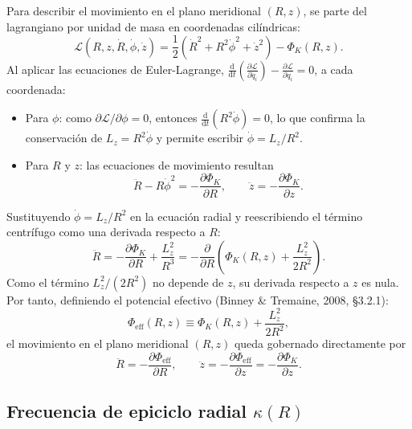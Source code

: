 \documentclass[11pt,letterpaper]{article}
\begin{document}
Para describir el movimiento en el plano meridional $(R, z)$, se parte del lagrangiano por unidad de masa en coordenadas cilíndricas:
\begin{equation}
    \mathcal{L}(R, z, \dot{R}, \dot{\phi}, \dot{z})
    = \frac{1}{2}\left(\dot{R}^2 + R^2\dot{\phi}^2 + \dot{z}^2\right) - \Phi_K(R, z).
\end{equation}
Al aplicar las ecuaciones de Euler-Lagrange, $\frac{\mathrm{d}}{\mathrm{d}t}\!\left(\frac{\partial \mathcal{L}}{\partial \dot{q}_i}\right) - \frac{\partial \mathcal{L}}{\partial q_i} = 0$, a cada coordenada:
\begin{itemize}
    \item Para $\phi$: como $\partial\mathcal{L}/\partial\phi = 0$, entonces $\frac{\mathrm{d}}{\mathrm{d}t}(R^2\dot{\phi}) = 0$, lo que confirma la conservación de $L_z = R^2\dot{\phi}$ y permite escribir $\dot{\phi} = L_z/R^2$.
    \item Para $R$ y $z$: las ecuaciones de movimiento resultan
    \begin{equation}
        \ddot{R} - R\dot{\phi}^2 = -\frac{\partial\Phi_K}{\partial R},
        \qquad
        \ddot{z} = -\frac{\partial\Phi_K}{\partial z}.
    \end{equation}
\end{itemize}
Sustituyendo $\dot{\phi} = L_z/R^2$ en la ecuación radial y reescribiendo el término centrífugo como una derivada respecto a $R$:
\begin{equation}
    \ddot{R} = -\frac{\partial\Phi_K}{\partial R} + \frac{L_z^2}{R^3}
    = -\frac{\partial}{\partial R}\!\left(\Phi_K(R, z) + \frac{L_z^2}{2R^2}\right).
\end{equation}
Como el término $L_z^2/(2R^2)$ no depende de $z$, su derivada respecto a $z$ es nula. Por tanto, definiendo el potencial efectivo (Binney \& Tremaine, 2008, \S 3.2.1):
\begin{equation}
    \boxed{\Phi_{\mathrm{eff}}(R, z) \equiv \Phi_K(R, z) + \frac{L_z^2}{2R^2}},
    \label{eq:phi_eff}
\end{equation}
el movimiento en el plano meridional $(R, z)$ queda gobernado directamente por
\begin{equation}
    \ddot{R} = -\frac{\partial\Phi_{\mathrm{eff}}}{\partial R},
    \qquad
    \ddot{z} = -\frac{\partial\Phi_{\mathrm{eff}}}{\partial z} = -\frac{\partial\Phi_K}{\partial z}.
\end{equation}

\subsection{Frecuencia de epiciclo radial \texorpdfstring{$\kappa(R)$}{kappa(R)}}
\end{document}
